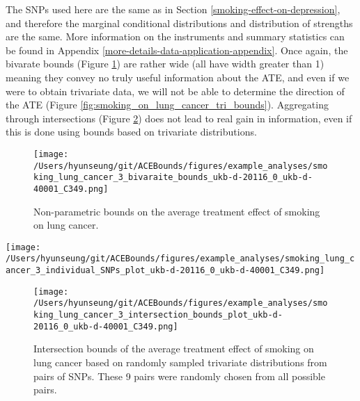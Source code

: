 \documentclass[
]{article}
\theoremstyle{plain}
\begin{document}
The SNPs used here are the same as in Section \ref{smoking-effect-on-depression}, and therefore the marginal conditional distributions and distribution of strengths are the same. More information on the instruments and summary statistics can be found in Appendix \ref{more-details-data-application-appendix}. Once again, the bivarate bounds (Figure \ref{fig:smoking_on_lung_cancer_ind_bounds}) are rather wide (all have width greater than 1) meaning they convey no truly useful information about the ATE, and even if we were to obtain trivariate data, we will not be able to determine the direction of the ATE (Figure \ref{fig:smoking_on_lung_cancer_tri_bounds}). Aggregating through intersections (Figure \ref{fig:smoking_on_lung_cancer_intersections}) does not lead to real gain in information, even if this is done using bounds based on trivariate distributions.

\begin{figure}[H]
  \texttt{[image: /Users/hyunseung/git/ACEBounds/figures/example\_analyses/smoking\_lung\_cancer\_3\_bivaraite\_bounds\_ukb-d-20116\_0\_ukb-d-40001\_C349.png]}
  \caption{Non-parametric bounds on the average treatment effect of smoking on lung cancer.}
  \label{fig:smoking_on_lung_cancer_ind_bounds}
\end{figure}

\clearpage

\begin{sidewaysfigure}
  \texttt{[image: /Users/hyunseung/git/ACEBounds/figures/example\_analyses/smoking\_lung\_cancer\_3\_individual\_SNPs\_plot\_ukb-d-20116\_0\_ukb-d-40001\_C349.png]}
    \caption{500 sets of bounds of the average treatment effect of smoking on lung cancer for each of the 84 SNPs. Each bound is based on a set of values for the trivariate distribution randomyl sampled. Bounds are color coded to show if they overlap 0 (grey) or do not (red). All bounds overlap 0.}
    \label{fig:smoking_on_lung_cancer_tri_bounds}
\end{sidewaysfigure}

\clearpage

\begin{figure}[H]
  \texttt{[image: /Users/hyunseung/git/ACEBounds/figures/example\_analyses/smoking\_lung\_cancer\_3\_intersection\_bounds\_plot\_ukb-d-20116\_0\_ukb-d-40001\_C349.png]}
  \caption{Intersection bounds of the average treatment effect of smoking on lung cancer based on randomly sampled trivariate distributions from pairs of SNPs. These 9 pairs were randomly chosen from all possible pairs.}
  \label{fig:smoking_on_lung_cancer_intersections}
\end{figure}
\end{document}
